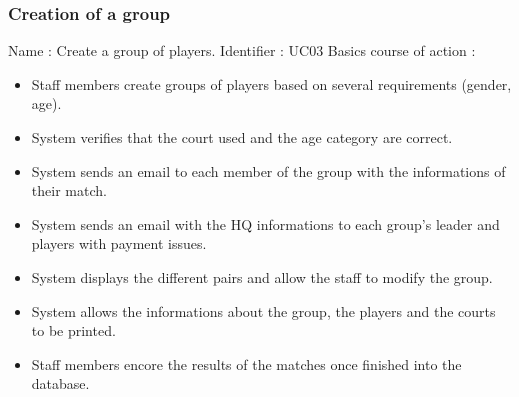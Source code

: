 \subsubsection{Creation of a group}

Name : Create a group of players. \newline
Identifier : UC03 \newline
Basics course of action : \newline
\begin{itemize}
	\item Staff members create groups of players based on several requirements (gender, age).
	\item System verifies that the court used and the age category are correct.
	\item System sends an email to each member of the group with the informations of their match.
	\item System sends an email with the HQ informations to each group's leader and players with payment issues.
	\item System displays the different pairs and allow the staff to modify the group.
	\item System allows the informations about the group, the players and the courts to be printed.
	\item Staff members encore the results of the matches once finished into the database.
\end{itemize}
